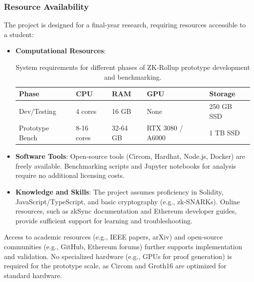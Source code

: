 \subsubsection{Resource Availability}
\vspace{12pt}
The project is designed for a final-year research, requiring resources accessible to a student:
\vspace{12pt}
\begin{itemize}
    \item \textbf{Computational Resources}: 
    \vspace{12pt}
    \begin{table}[h!]
\centering
\begin{tabular}{lllll}
\toprule
\textbf{Phase} & \textbf{CPU} & \textbf{RAM} & \textbf{GPU} & \textbf{Storage} \\
\midrule
Dev/Testing & 4 cores & 16 GB & None & 250 GB SSD \\
Prototype Bench & 8-16 cores & 32-64 GB & RTX 3080 / A6000 & 1 TB SSD \\
\bottomrule
\end{tabular}
\caption{System requirements for different phases of ZK-Rollup prototype development and benchmarking.}
\end{table}
\vspace{12pt}


    \item \textbf{Software Tools}: Open-source tools (Circom, Hardhat, Node.js, Docker) are freely available. Benchmarking scripts and Jupyter notebooks for analysis require no additional licensing costs.
    \item \textbf{Knowledge and Skills}: The project assumes proficiency in Solidity, JavaScript/TypeScript, and basic cryptography (e.g., zk-SNARKs). Online resources, such as zkSync documentation and Ethereum developer guides, provide sufficient support for learning and troubleshooting.
\end{itemize}
\vspace{12pt}
Access to academic resources (e.g., IEEE papers, arXiv) and open-source communities (e.g., GitHub, Ethereum forums) further supports implementation and validation. No specialized hardware (e.g., GPUs for proof generation) is required for the prototype scale, as Circom and Groth16 are optimized for standard hardware.
\vspace{12pt}

